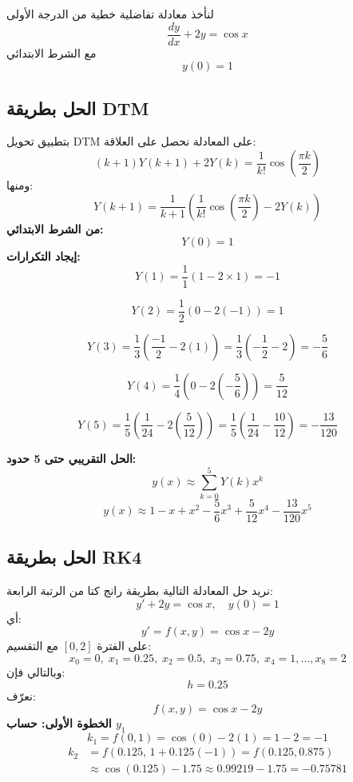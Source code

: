 \begin{example}
	لنأخذ معادلة تفاضلية خطية من الدرجة الأولى
	\begin{equation}
		\frac{dy}{dx} + 2y = \cos x
	\end{equation}
	مع الشرط الابتدائي
	\begin{equation}
		y(0) = 1
	\end{equation}
	\subsection*{الحل بطريقة DTM}
		بتطبيق تحويل DTM على المعادلة نحصل على العلاقة:
		\[
		(k+1)Y(k+1) + 2Y(k) = \frac{1}{k!}\cos\left(\frac{\pi k}{2}\right)
		\]
		ومنها:
		\[
		Y(k+1) = \frac{1}{k+1}\left(\frac{1}{k!}\cos\left(\frac{\pi k}{2}\right) - 2Y(k)\right)
		\]
		\textbf{من الشرط الابتدائي:}
		\[
		Y(0)=1
		\]
		\textbf{إيجاد التكرارات:}
		\[
		Y(1) = \frac{1}{1}\left(1 - 2\times 1\right) = -1
		\]
		
		\[
		Y(2) = \frac{1}{2}\left(0 - 2(-1)\right) = 1
		\]
		
		\[
		Y(3) = \frac{1}{3}\left(\frac{-1}{2} - 2(1)\right) = \frac{1}{3}\left(-\frac{1}{2} -2\right) = -\frac{5}{6}
		\]
		
		\[
		Y(4) = \frac{1}{4}\left(0 - 2\left(-\frac{5}{6}\right)\right) = \frac{5}{12}
		\]
		
		\[
		Y(5) = \frac{1}{5}\left(\frac{1}{24} - 2\left(\frac{5}{12}\right)\right) = \frac{1}{5}\left(\frac{1}{24} - \frac{10}{12}\right) = -\frac{13}{120}
		\]
		
		\textbf{الحل التقريبي حتى 5 حدود:}
		\[
		y(x) \approx \sum_{k=0}^{5} Y(k)x^k
		\]
		\[
		y(x) \approx 1 - x + x^2 - \frac{5}{6}x^3 + \frac{5}{12}x^4 - \frac{13}{120}x^5
		\]

		
		
		\subsection*{الحل بطريقة RK4}
		
		نريد حل المعادلة التالية بطريقة رانج كتا من الرتبة الرابعة:
		\[
		y' + 2y = \cos x, \quad y(0)=1
		\]
		أي:
		\[
		y' = f(x,y) = \cos x - 2y
		\]
		على الفترة \([0,2]\) مع التقسيم:
		\[
		x_0=0,\; x_1=0.25,\; x_2=0.5,\; x_3=0.75,\; x_4=1,\dots, x_8=2
		\]
		وبالتالي فإن:
		\[
		h = 0.25
		\]
		نعرّف:
		\[
		f(x,y)=\cos x - 2y
		\]
		\textbf{الخطوة الأولى: حساب \(y_1\)}
		\[
		k_1 = f(0,1)=\cos(0)-2(1)=1-2=-1
		\]
		\[
		\begin{split}
			k_2 &= f\left(0.125,\, 1 + 0.125(-1)\right) 
			= f(0.125, 0.875) \\
			&\approx \cos(0.125)-1.75 
			\approx 0.99219-1.75 
			= -0.75781
		\end{split}
		\]
		

\end{example}
